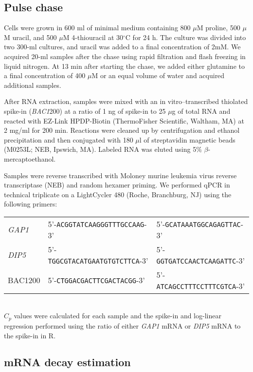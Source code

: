 \subsection{Pulse chase} 

Cells were grown in
600 ml of minimal medium containing 800 $\mu$M proline, 500 $\mu$M uracil, and
500 $\mu$M 4-thiouracil at 30$^{\circ}$C for 24 h. The culture was divided into two
300-ml cultures, and uracil was added to a final concentration of 2mM. 
We acquired 20-ml samples after the chase using rapid filtration
and flash freezing in liquid nitrogen. At 13 min after starting the
chase, we added either glutamine to a final concentration of 400 $\mu$M or
an equal volume of water and acquired additional samples.  

After RNA
extraction, samples were mixed with an in vitro–transcribed thiolated
spike-in (\textit{BAC1}200) at a ratio of 1 ng of spike-in to 25 $\mu$g of total
RNA and reacted with EZ-Link HPDP-Biotin (ThermoFisher Scientific,
Waltham, MA) at 2 mg/ml for 200 min. Reactions were cleaned up by
centrifugation and ethanol precipitation and then conjugated with 180
$\mu$l of streptavidin magnetic beads (M0253L; NEB, Ipswich, MA). Labeled
RNA was eluted using 5\% $\beta$-mercaptoethanol.  

Samples were reverse
transcribed with Moloney murine leukemia virus reverse transcriptase
(NEB) and random hexamer priming. We performed qPCR in technical
triplicate on a LightCycler 480 (Roche, Branchburg, NJ) using the
following primers: \\[1em]
\begin{tabular}{l | p{15em} p{15em}}
  \textit{GAP1} & 5'-\texttt{ACGGTATCAAGGGTTTGCCAAG}-3' &
    5'-\texttt{GCATAAATGGCAGAGTTAC}-3' \\
  \textit{DIP5} & 5'-\texttt{TGGCGTACATGAATGTGTCTTCA}-3' &
    5'-\texttt{GGTGATCCAACTCAAGATTC}-3' \\
  BAC1200 & 5'-\texttt{CTGGACGACTTCGACTACGG}-3' & 
    5'-\texttt{ATCAGCCTTTCCTTTCGTCA}-3' \\
\end{tabular} \\[1em]
$C_p$ values
were calculated for each sample and the spike-in and log-linear
regression performed using the ratio of either \textit{GAP1} mRNA or \textit{DIP5} mRNA
to the spike-in in R.  

\subsection{mRNA decay estimation}

